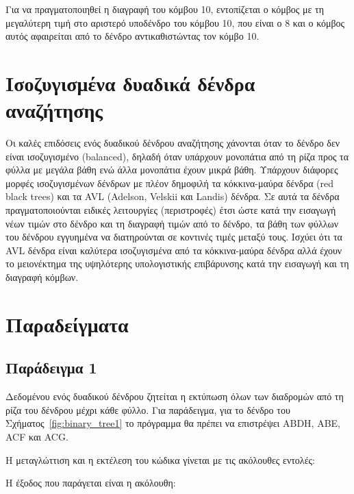 Για να πραγματοποιηθεί η διαγραφή του κόμβου 10, εντοπίζεται ο κόμβος με τη μεγαλύτερη τιμή στο αριστερό υποδένδρο του κόμβου 10, που είναι ο 8 και ο κόμβος αυτός αφαιρείται από το δένδρο αντικαθιστώντας τον κόμβο 10.

\section{Ισοζυγισμένα δυαδικά δένδρα αναζήτησης}
\label{bbst}

Οι καλές επιδόσεις ενός δυαδικού δένδρου αναζήτησης χάνονται όταν το δένδρο δεν είναι ισοζυγισμένο (balanced), δηλαδή όταν υπάρχουν μονοπάτια από τη ρίζα προς τα φύλλα με μεγάλα βάθη ενώ άλλα μονοπάτια έχουν μικρά βάθη. Υπάρχουν διάφορες μορφές ισοζυγισμένων δένδρων με πλέον δημοφιλή τα κόκκινα-μαύρα δένδρα (red black trees) και τα AVL (Adelson, Velskii και Landis) δένδρα. Σε αυτά τα δένδρα πραγματοποιούνται ειδικές λειτουργίες (περιστροφές) έτσι ώστε κατά την εισαγωγή νέων τιμών στο δένδρο και τη διαγραφή τιμών από το δένδρο, τα βάθη των φύλλων του δένδρου εγγυημένα να διατηρούνται σε κοντινές τιμές μεταξύ τους. Ισχύει ότι τα AVL δένδρα είναι καλύτερα ισοζυγισμένα από τα κόκκινα-μαύρα δένδρα αλλά έχουν το μειονέκτημα της υψηλότερης υπολογιστικής επιβάρυνσης κατά την εισαγωγή και τη διαγραφή κόμβων.

\section{Παραδείγματα}

\subsection{Παράδειγμα 1}

Δεδομένου ενός δυαδικού δένδρου ζητείται η εκτύπωση όλων των διαδρομών από τη ρίζα του δένδρου μέχρι κάθε φύλλο. Για παράδειγμα, για το δένδρο του Σχήματος~\ref{fig:binary_tree1} το πρόγραμμα θα πρέπει να επιστρέψει ABDH, ABE, ACF και ACG.



Η μεταγλώττιση και η εκτέλεση του κώδικα γίνεται με τις ακόλουθες εντολές:



Η έξοδος που παράγεται είναι η ακόλουθη:




